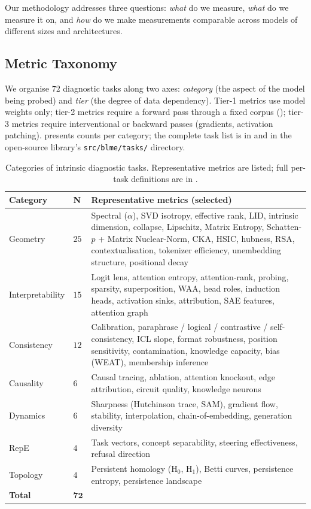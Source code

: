 \documentclass[preprint]{neurips_2025}
\begin{document}
Our methodology addresses three questions: \emph{what} do we measure, \emph{what} do we measure it on, and \emph{how} do we make measurements comparable across models of different sizes and architectures.

\subsection{Metric Taxonomy}
\label{sec:taxonomy}

We organise $72$ diagnostic tasks along two axes: \emph{category} (the aspect of the model being probed) and \emph{tier} (the degree of data dependency).
Tier-1 metrics use model weights only; tier-2 metrics require a forward pass through a fixed corpus (); tier-3 metrics require interventional or backward passes (gradients, activation patching).  presents counts per category; the complete task list is in  and in the open-source library's \texttt{src/blme/tasks/} directory.

\begin{table}[t]
\centering
\caption{Categories of intrinsic diagnostic tasks. Representative metrics are listed; full per-task definitions are in .}
\label{tab:taxonomy}
\small
\begin{tabular}{@{}llp{8.3cm}@{}}
\toprule
\textbf{Category} & \textbf{N} & \textbf{Representative metrics (selected)} \\
\midrule
Geometry & $25$ & Spectral ($\alpha$), SVD isotropy, effective rank, LID, intrinsic dimension, collapse, Lipschitz, Matrix Entropy, Schatten-$p$ + Matrix Nuclear-Norm, CKA, HSIC, hubness, RSA, contextualisation, tokenizer efficiency, unembedding structure, positional decay \\
Interpretability & $15$ & Logit lens, attention entropy, attention-rank, probing, sparsity, superposition, WAA, head roles, induction heads, activation sinks, attribution, SAE features, attention graph \\
Consistency & $12$ & Calibration, paraphrase / logical / contrastive / self-consistency, ICL slope, format robustness, position sensitivity, contamination, knowledge capacity, bias (WEAT), membership inference \\
Causality & $6$ & Causal tracing, ablation, attention knockout, edge attribution, circuit quality, knowledge neurons \\
Dynamics & $6$ & Sharpness (Hutchinson trace, SAM), gradient flow, stability, interpolation, chain-of-embedding, generation diversity \\
RepE & $4$ & Task vectors, concept separability, steering effectiveness, refusal direction \\
Topology & $4$ & Persistent homology (H$_0$, H$_1$), Betti curves, persistence entropy, persistence landscape \\
\midrule
\textbf{Total} & $\mathbf{72}$ & \\
\bottomrule
\end{tabular}
\end{table}
\end{document}
